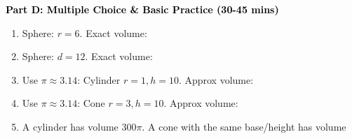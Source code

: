 \documentclass[12pt, letterpaper, fleqn]{article}
\newcommand{\blank}{\underline{\hspace{2.2cm}}}
\begin{document}
\newpage

\begin{tcolorbox}[colback=customteal!20]
\large\textcolor{black}{\textbf{Part D: Multiple Choice \& Basic Practice (30-45 mins)}}
\end{tcolorbox}

\vspace{3mm}

\begin{enumerate}[itemsep=2.5cm, leftmargin=0.6cm, resume]
\item Sphere: $r=6$. Exact volume: \blank
\item Sphere: $d=12$. Exact volume: \blank
\item Use $\pi \approx 3.14$: Cylinder $r=1, h=10$. Approx volume: \blank
\item Use $\pi \approx 3.14$: Cone $r=3, h=10$. Approx volume: \blank
\item A cylinder has volume $300\pi$. A cone with the same base/height has volume \blank
\end{enumerate}
\end{document}
